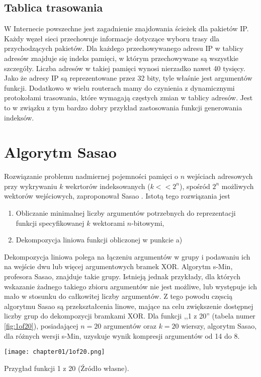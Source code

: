 \subsection{Tablica trasowania}
W Internecie powszechne jest zagadnienie znajdowania ścieżek dla pakietów IP.
Każdy węzeł sieci przechowuje informacje dotyczące wyboru trasy dla przychodzących pakietów.
Dla każdego przechowywanego adresu IP w tablicy adresów znajduje się indeks pamięci, w którym przechowywane są wszystkie szczegóły.
Liczba adresów w takiej pamięci wynosi nierzadko nawet 40 tysięcy.
Jako że adresy IP są reprezentowane przez 32 bity, tyle właśnie jest argumentów funkcji.
Dodatkowo w wielu routerach mamy do czynienia z dynamicznymi protokołami trasowania, które wymagają częstych zmian w tablicy adresów.
Jest to w związku z tym bardzo dobry przykład zastosowania funkcji generowania indeksów.


\section{Algorytm Sasao}
Rozwiązanie problemu nadmiernej pojemności pamięci o $n$ wejściach adresowych przy wykrywaniu $k$ wekrtorów indeksowanych ($k<<2^n$),
spośród $2^n$ możliwych wektorów wejściowych,
zaproponował Sasao \cite{sasao-workshop, sasao-recent, sasao-s-min, sasao-synthesis}.
Istotą tego rozwiązania jest
\begin{enumerate}[label=\alph*)]
\item Obliczanie minimalnej liczby argumentów potrzebnych do reprezentacji funkcji specyfikowanej $k$ wektorami $n$-bitowymi,
\item Dekompozycja liniowa funkcji obliczonej w punkcie a)
\end{enumerate}

Dekompozycja liniowa polega na łączeniu argumentów w grupy i podawaniu ich na wejście dwu lub więcej argumentowych bramek XOR.
Algorytm s-Min, profesora Sasao, znajduje takie grupy.
Istnieją jednak przykłady,
dla których wskazanie żadnego takiego zbioru argumentów nie jest możliwe,
lub występuje ich mało w stosunku do całkowitej liczby argumentów.
Z tego powodu częscią algorytmu Sasao są przekształcenia linowe,
mające na celu zwiększenie dostępnej liczby grup do dekompozycji bramkami XOR.
Dla funkcji ,,1 z 20'' (tabela numer \ref{fig:1of20}),
posiadającej $n=20$ argumentów oraz $k=20$ wierszy,
algorytm Sasao,
dla różnych wersji s-Min,
uzyskuje wynik kompresji argumentów od 14 do 8.

\begin{table}
\centering
\texttt{[image: chapter01/1of20.png]}
\caption{Przygład funkcji 1 z 20 (Źródło własne).}
\label{fig:1of20}
\end{table}

